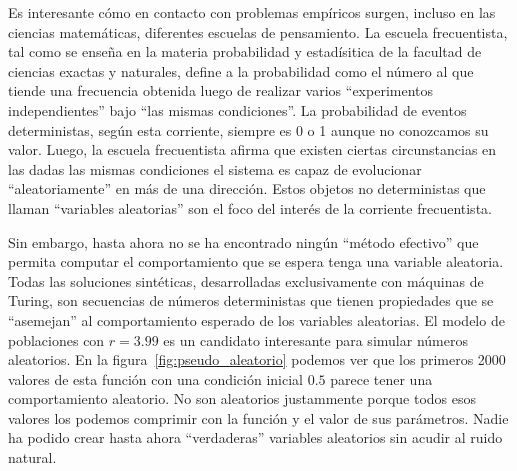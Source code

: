\documentclass[a4paper,10pt]{book}
\begin{document}

Es interesante cómo en contacto con problemas empíricos surgen, incluso en las ciencias matemáticas, diferentes escuelas de pensamiento.
La escuela frecuentista, tal como se enseña en la materia probabilidad y estadísitica de la facultad de ciencias exactas y naturales, define a la probabilidad como el número al que tiende una frecuencia obtenida luego de realizar varios ``experimentos independientes'' bajo ``las mismas condiciones''.
La probabilidad de eventos deterministas, según esta corriente, siempre es 0 o 1 aunque no conozcamos su valor.
Luego, la escuela frecuentista afirma que existen ciertas circunstancias en las dadas las mismas condiciones el sistema es capaz de evolucionar ``aleatoriamente'' en más de una dirección.
Estos objetos no deterministas que llaman ``variables aleatorias'' son el foco del interés de la corriente frecuentista.


Sin embargo, hasta ahora no se ha encontrado ningún ``método efectivo'' que permita computar el comportamiento que se espera tenga una variable aleatoria.
Todas las soluciones sintéticas, desarrolladas exclusivamente con máquinas de Turing, son secuencias de números deterministas que tienen propiedades que se ``asemejan'' al comportamiento esperado de los variables aleatorias.
El modelo de poblaciones con $r = 3.99$ es un candidato interesante para simular números aleatorios.
En la figura~\ref{fig:pseudo_aleatorio} podemos ver que los primeros 2000 valores de esta función con una condición inicial $0.5$ parece tener una comportamiento aleatorio.
No son aleatorios justammente porque todos esos valores los podemos comprimir con la función y el valor de sus parámetros.
Nadie ha podido crear hasta ahora ``verdaderas'' variables aleatorios sin acudir al ruido natural.

\end{document}
